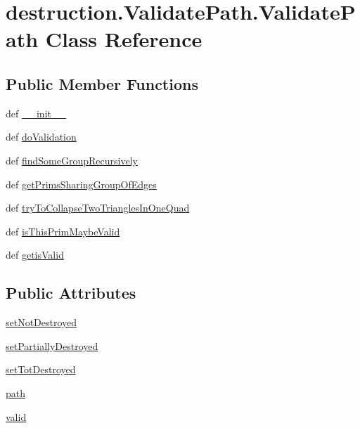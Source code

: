 \hypertarget{classdestruction_1_1_validate_path_1_1_validate_path}{\section{destruction.\-Validate\-Path.\-Validate\-Path Class Reference}
\label{classdestruction_1_1_validate_path_1_1_validate_path}
}
\subsection*{Public Member Functions}
\begin{DoxyCompactItemize}
\item 
def \hyperlink{classdestruction_1_1_validate_path_1_1_validate_path_abdbceeed4b2925bae5230c48954dbc17}{\-\_\-\-\_\-init\-\_\-\-\_\-}
\item 
def \hyperlink{classdestruction_1_1_validate_path_1_1_validate_path_a91cf1acffc8a00f62f67fb42c14034b0}{do\-Validation}
\item 
def \hyperlink{classdestruction_1_1_validate_path_1_1_validate_path_aad3f20c3431eef3614eb373c124a9f49}{find\-Some\-Group\-Recursively}
\item 
def \hyperlink{classdestruction_1_1_validate_path_1_1_validate_path_a4e0cfca833a9e1ef571ed9b6d38723be}{get\-Prims\-Sharing\-Group\-Of\-Edges}
\item 
def \hyperlink{classdestruction_1_1_validate_path_1_1_validate_path_a41af599b3e2a966070eaa5d17b770a10}{try\-To\-Collapse\-Two\-Triangles\-In\-One\-Quad}
\item 
def \hyperlink{classdestruction_1_1_validate_path_1_1_validate_path_a3e1b00c19f877fe2d63842d156ea09ad}{is\-This\-Prim\-Maybe\-Valid}
\item 
def \hyperlink{classdestruction_1_1_validate_path_1_1_validate_path_a59a8333365fe80cb5ab32042d2ddef49}{getis\-Valid}
\end{DoxyCompactItemize}
\subsection*{Public Attributes}
\begin{DoxyCompactItemize}
\item 
\hyperlink{classdestruction_1_1_validate_path_1_1_validate_path_aace162ccc6a8d1c9dd52abe1d45f2ae5}{set\-Not\-Destroyed}
\item 
\hyperlink{classdestruction_1_1_validate_path_1_1_validate_path_ab0a15037eea9eb5f8efba5e91db3dd3e}{set\-Partially\-Destroyed}
\item 
\hyperlink{classdestruction_1_1_validate_path_1_1_validate_path_ae4e81613d72b2bae953aecf91a7f50a3}{set\-Tot\-Destroyed}
\item 
\hyperlink{classdestruction_1_1_validate_path_1_1_validate_path_ad35cdb3805a0a9341533dae6d4a27905}{path}
\item 
\hyperlink{classdestruction_1_1_validate_path_1_1_validate_path_a5cff4e3f7df6bc2cec558baaaf95f3d1}{valid}
\end{DoxyCompactItemize}


